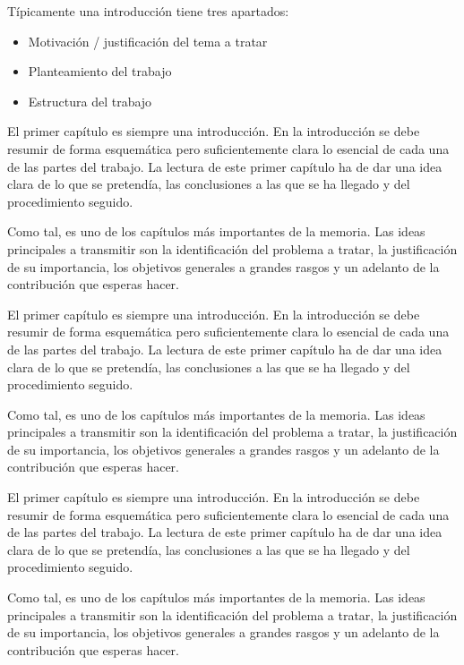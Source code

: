 \documentclass[11pt,a4paper,spanish]{book}
\numberwithin{equation}{chapter}
\numberwithin{figure}{chapter}
\begin{document}
Típicamente una introducción tiene tres apartados:
\begin{itemize}
\item Motivación / justificación del tema a tratar
\item Planteamiento del trabajo
\item Estructura del trabajo
\end{itemize}


El primer capítulo es siempre una introducción. En la introducción se debe resumir de forma esquemática pero suficientemente clara lo esencial de cada una de las partes del trabajo. La lectura de este primer capítulo ha de dar una idea clara de lo que se pretendía, las conclusiones a las que se ha llegado y del procedimiento seguido.

Como tal, es uno de los capítulos más importantes de la memoria. Las ideas principales a transmitir son la identificación del problema a tratar, la justificación de su importancia, los objetivos generales a grandes rasgos y un adelanto de la contribución que esperas hacer.






El primer capítulo es siempre una introducción. En la introducción se debe resumir de forma esquemática pero suficientemente clara lo esencial de cada una de las partes del trabajo. La lectura de este primer capítulo ha de dar una idea clara de lo que se pretendía, las conclusiones a las que se ha llegado y del procedimiento seguido.

Como tal, es uno de los capítulos más importantes de la memoria. Las ideas principales a transmitir son la identificación del problema a tratar, la justificación de su importancia, los objetivos generales a grandes rasgos y un adelanto de la contribución que esperas hacer.



El primer capítulo es siempre una introducción. En la introducción se debe resumir de forma esquemática pero suficientemente clara lo esencial de cada una de las partes del trabajo. La lectura de este primer capítulo ha de dar una idea clara de lo que se pretendía, las conclusiones a las que se ha llegado y del procedimiento seguido.

Como tal, es uno de los capítulos más importantes de la memoria. Las ideas principales a transmitir son la identificación del problema a tratar, la justificación de su importancia, los objetivos generales a grandes rasgos y un adelanto de la contribución que esperas hacer.
\end{document}
